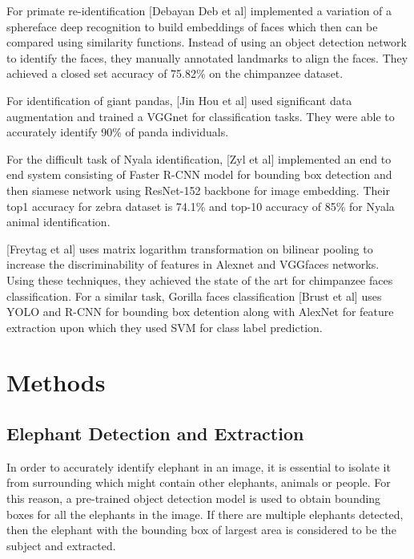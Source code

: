 \documentclass[10pt,twocolumn,letterpaper]{article}
\begin{document}
For primate re-identification [Debayan Deb et al] implemented a variation of a sphereface deep recognition to build embeddings of faces which then can be compared using similarity functions. Instead of using an object detection network to identify the faces, they manually annotated landmarks to align the faces. They achieved a closed set accuracy of 75.82\% on the chimpanzee dataset.

For identification of giant pandas, [Jin Hou et al] used significant data augmentation and trained a VGGnet for classification tasks. They were able to accurately identify 90\% of panda individuals.

For the difficult task of Nyala identification, [Zyl et al] implemented an end to end system consisting of Faster R-CNN model for bounding box detection and then siamese network using ResNet-152 backbone for image embedding. Their top1 accuracy for zebra dataset is 74.1\% and top-10 accuracy of 85\% for Nyala animal identification.

[Freytag et al] uses matrix logarithm transformation on bilinear pooling to increase the discriminability of features in Alexnet and VGGfaces networks. Using these techniques, they achieved the state of the art for chimpanzee faces classification. For a similar task, Gorilla faces classification [Brust et al] uses YOLO and R-CNN for bounding box detention along with AlexNet for feature extraction upon which they used SVM for class label prediction.



\section{Methods}
\label{sec:methods}

\subsection{Elephant Detection and Extraction}

In order to accurately identify elephant in an image, it is essential to isolate it from surrounding which might contain other elephants, animals or people. For this reason, a pre-trained object detection model is used to obtain bounding boxes for all the elephants in the image. If there are multiple elephants detected, then the elephant with the bounding box of largest area is considered to be the subject and extracted.
\end{document}

